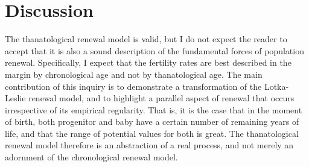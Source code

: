\documentclass[12pt,oneside,a4paper,leqno]{article}
\begin{document}

\section*{Discussion}
The thanatological renewal model is valid, but I do not expect the reader to
accept that it is also a sound description of the fundamental forces of
population renewal. Specifically, I expect that the fertility rates are best
described in the margin by chronological age and not by thanatological age. The
main contribution of this inquiry is to demonstrate a transformation of the
Lotka-Leslie renewal model, and to highlight a parallel aspect of renewal that
occurs irrespective of its empirical regularity. That is, it is the case
that in the moment of birth, both progenitor and baby have a certain number of
remaining years of life, and that the range of potential values for both is
great. The thanatological renewal
model therefore is an abstraction of a real process, and not merely an adornment of the chronological renewal model.
\end{document}
